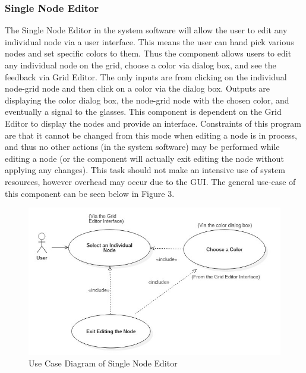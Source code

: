 \documentclass[12pt]{article}
\begin{document}
	\subsubsection {Single Node Editor}
  	The Single Node Editor in the system software will allow the user to edit any individual node via a user interface. This means the user can hand pick various nodes and set specific colors to them. Thus the component allows users to edit any individual node on the grid, choose a color via dialog box, and see the feedback via Grid Editor. The only inputs are from clicking on the individual node-grid node and then click on a color via the dialog box. Outputs are displaying the color dialog box, the node-grid node with the chosen color, and eventually a signal to the glasses. This component is dependent on the Grid Editor to display the nodes and provide an interface. Constraints of this program are that it cannot be changed from this mode when editing a node is in process, and thus no other actions (in the system software) may be performed while editing a node (or the component will actually exit editing the node without applying any changes). This task should not make an intensive use of system resources, however overhead may occur due to the GUI. The general use-case of this component can be seen below in Figure 3.  	
  	\begin{figure}[ht!]
  		\centering
  		\includegraphics[width=\linewidth]{SingleNodeEditorDiagram.JPG}
  		\caption{Use Case Diagram of Single Node Editor \label{overflow}}
  	\end{figure}
	
\end{document}

